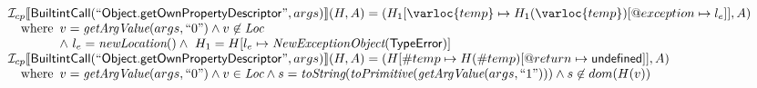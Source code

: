 \[
\begin{array}{l}

\I _{cp}\lbr \SF{BuiltintCall}(``\SF{Object.getOwnPropertyDescriptor}",args)\rbr(H,A)
 = (H_1[\varloc{temp}\mapsto H_1(\varloc{temp})[\varprop{exception}\mapsto l_{e}]], A) \\
\quad\wherec{
  v = \hf{getArgValue}(args, ``0") \land v\not\in\Loc\\
  \land\ l_e = \hf{newLocation}() \land\ H_1=H[l_e\mapsto\hf{NewExceptionObject}(\SF{TypeError})] }\\

\I _{cp}\lbr \SF{BuiltintCall}(``\SF{Object.getOwnPropertyDescriptor}",args)\rbr(H,A)
 = (H[\#temp \mapsto H(\#temp)[@return \mapsto \SF{undefined}]], A)\\
  \quad\wherec{v = \hf{getArgValue}(args, ``0") \land v \in\Loc
  \land s = \hf{toString}(\hf{toPrimitive}(\hf{getArgValue}(args,``1"))) \land s \not\in dom(H(v))}\\


\end{array}\]
